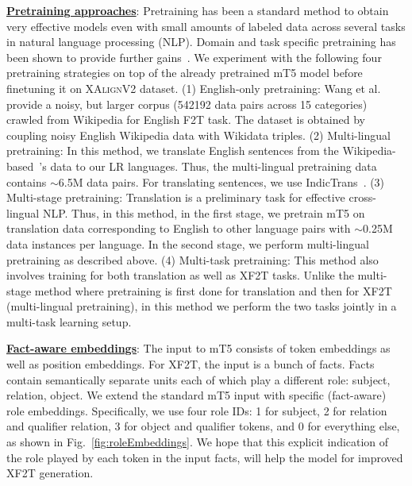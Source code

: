 \documentclass[runningheads]{llncs}
\newcommand{\data}{\textsc{XAlignV2}}
\begin{document}
\noindent\underline{\textbf{Pretraining approaches}}: Pretraining has been a standard method to obtain very effective models even with small amounts of labeled data across several tasks in natural language processing (NLP). Domain and task specific pretraining has been shown to provide further gains~\cite{gururangan2020don}. We experiment with the following four pretraining strategies on top of the already pretrained mT5 model before finetuning it on \data{} dataset.
(1) English-only pretraining: Wang et al.~\cite{wang2021stage} provide a noisy, but larger corpus (542192 data pairs across 15 categories) crawled from Wikipedia for English F2T task. The dataset is obtained by coupling noisy English Wikipedia data with Wikidata triples. 
(2) Multi-lingual pretraining: In this method, we translate English sentences from the Wikipedia-based~\cite{wang2021stage}'s data to our LR languages. Thus, the multi-lingual pretraining data contains $\sim$6.5M data pairs. For translating sentences, we use IndicTrans~\cite{ramesh2021samanantar}. 
(3) Multi-stage pretraining: Translation is a preliminary task for effective cross-lingual NLP. Thus, in this method, in the first stage, we pretrain mT5 on translation data corresponding to English to other language pairs with $\sim$0.25M data instances per language. In the second stage, we perform multi-lingual pretraining as described above.
(4) Multi-task pretraining: This method also involves training for both translation as well as XF2T tasks. Unlike the multi-stage method where pretraining is first done for translation and then for XF2T (multi-lingual pretraining), in this method we perform the two tasks jointly in a multi-task learning setup.











\noindent\underline{\textbf{Fact-aware embeddings}}: 
The input to mT5 consists of token embeddings as well as position embeddings. For XF2T, the input is a bunch of facts. Facts contain semantically separate units each of which play a different role: subject, relation, object. We extend the standard mT5 input with specific (fact-aware) role embeddings. Specifically, we use four role IDs: 1 for subject, 2 for relation and qualifier relation, 3 for object and qualifier tokens, and 0 for everything else, as shown in Fig.~\ref{fig:roleEmbeddings}. We hope that this explicit indication of the role played by each token in the input facts, will help the model for improved XF2T generation. 
\end{document}
